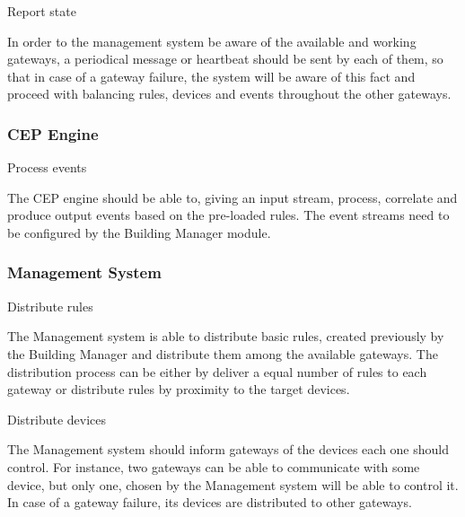 \begin{Paragraph}{Report state}
	
In order to the management system be aware of the available and working gateways, a periodical message or heartbeat should be sent by each of them, so that in case of a gateway failure, the system will be aware of this fact and proceed with balancing rules, devices and events throughout the other gateways.

\end{Paragraph}

\subsubsection{CEP Engine}

\begin{Paragraph}{Process events}
	
The CEP engine should be able to, giving an input stream, process, correlate and produce output events based on the pre-loaded rules. The event streams need to be configured by the Building Manager module.

\end{Paragraph}

\subsubsection{Management System}

\begin{Paragraph}{Distribute rules}
	
The Management system is able to distribute basic rules, created previously by the Building Manager and distribute them among the available gateways. The distribution process can be either by deliver a equal number of rules to each gateway or distribute rules by proximity to the target devices.
	
\end{Paragraph}

\begin{Paragraph}{Distribute devices}
	
The Management system should inform gateways of the devices each one should control. For instance, two gateways can be able to communicate with some device, but only one, chosen by the Management system will be able to control it. In case of a gateway failure, its devices are distributed to other gateways.
	
\end{Paragraph}

